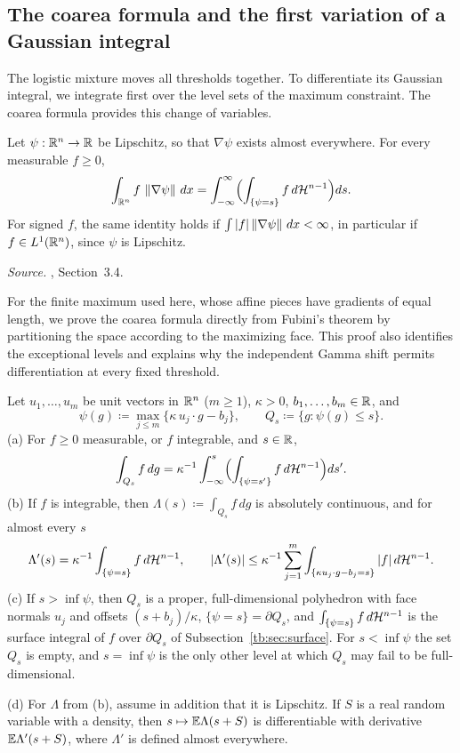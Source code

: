 \subsection{The coarea formula and the first variation of a Gaussian
integral}\label{tb:sec:coarea}

The logistic mixture moves all thresholds together. To differentiate
its Gaussian integral, we integrate first over the level sets of the
maximum constraint. The coarea formula provides this change of variables.

\begin{fact}\label{tb:coarea}
Let \(\psi:\mathbb R^n\to\mathbb R\) be Lipschitz, so that \(\nabla\psi\) exists almost
everywhere. For every measurable \(f\ge0\),
\[
 \int_{\mathbb R^n}f\,\left\lVert\nabla\psi\right\rVert\,dx=\int_{-\infty}^\infty
 \Bigl(\int_{\{\psi=s\}}f\,d\mathcal H^{n-1}\Bigr)ds.
\]
For signed \(f\), the same identity holds if
\(\int |f|\left\lVert\nabla\psi\right\rVert\,dx<\infty\), in particular if
\(f\in L^1(\mathbb R^n)\), since \(\psi\) is Lipschitz.
\end{fact}

\emph{Source.} , Section~3.4.

For the finite maximum used here, whose affine pieces have gradients of
equal length, we prove the coarea formula directly from Fubini's theorem
by partitioning the space according to the maximizing face.
This proof also identifies the exceptional levels and explains why the
independent Gamma shift permits differentiation at every fixed threshold.

\begin{fact}\label{tb:variation}
Let \(u_1,\ldots,u_m\) be unit vectors in \(\mathbb R^n\) (\(m\ge1\)), \(\kappa>0\),
\(b_1,\ldots,b_m\in\mathbb R\), and
\[
 \psi(g)\coloneqq \max_{j\le m}\{\kappa\,u_j\cdot g-b_j\},\qquad Q_s\coloneqq \{g:\psi(g)\le s\}.
\]
(a) For \(f\ge0\) measurable, or \(f\) integrable, and \(s\in\mathbb R\),
\[
 \int_{Q_s}f\,dg=\kappa^{-1}\int_{-\infty}^s\Bigl(\int_{\{\psi=s'\}}f\,d\mathcal H^{n-1}
 \Bigr)ds'.
\]
(b) If \(f\) is integrable, then \(\Lambda(s)\coloneqq \int_{Q_s}f\,dg\) is absolutely
continuous, and for almost every \(s\)
\[
 \Lambda'(s)=\kappa^{-1}\int_{\{\psi=s\}}f\,d\mathcal H^{n-1},\qquad
 |\Lambda'(s)|\le\kappa^{-1}\sum_{j=1}^m\int_{\{\kappa u_j\cdot g-b_j=s\}}|f|\,d\mathcal H^{n-1}.
\]
(c) If \(s>\inf\psi\), then \(Q_s\) is a proper, full-dimensional polyhedron
with face normals \(u_j\) and offsets \((s+b_j)/\kappa\), \(\{\psi=s\}=\partial Q_s\),
and \(\int_{\{\psi=s\}}f\,d\mathcal H^{n-1}\) is the surface integral of \(f\) over
\(\partial Q_s\) of Subsection~\ref{tb:sec:surface}. For \(s<\inf\psi\) the set
\(Q_s\) is empty, and \(s=\inf\psi\) is the only other level at which \(Q_s\)
may fail to be full-dimensional.

(d) For \(\Lambda\) from (b), assume in addition that it is
Lipschitz. If \(S\) is a real random variable with a density, then \(s\mapsto\mathbb E\Lambda(s+S)\) is differentiable with derivative
\(\mathbb E\Lambda'(s+S)\), where \(\Lambda'\) is defined almost everywhere.
\end{fact}

